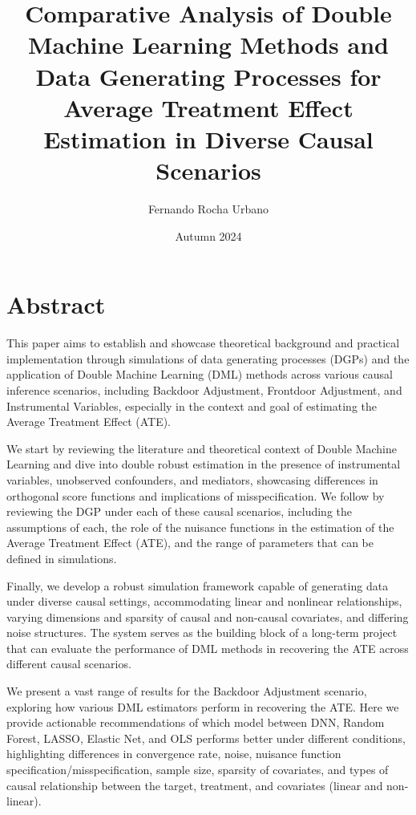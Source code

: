 \documentclass{article}
\title{Comparative Analysis of Double Machine Learning Methods and Data Generating Processes for Average Treatment Effect Estimation in Diverse Causal Scenarios}
\author{Fernando Rocha Urbano}
\date{Autumn 2024}
\numberwithin{equation}{section}
\begin{document}
\maketitle

\section{Abstract}

This paper aims to establish and showcase theoretical background and practical implementation through simulations of data generating processes (DGPs) and the application of Double Machine Learning (DML) methods across various causal inference scenarios, including Backdoor Adjustment, Frontdoor Adjustment, and Instrumental Variables, especially in the context and goal of estimating the Average Treatment Effect (ATE).

We start by reviewing the literature and theoretical context of Double Machine Learning and dive into double robust estimation in the presence of instrumental variables, unobserved confounders, and mediators, showcasing differences in orthogonal score functions and implications of misspecification. We follow by reviewing the DGP under each of these causal scenarios, including the assumptions of each, the role of the nuisance functions in the estimation of the Average Treatment Effect (ATE), and the range of parameters that can be defined in simulations.

Finally, we develop a robust simulation framework capable of generating data under diverse causal settings, accommodating linear and nonlinear relationships, varying dimensions and sparsity of causal and non-causal covariates, and differing noise structures. The system serves as the building block of a long-term project that can evaluate the performance of DML methods in recovering the ATE across different causal scenarios.

We present a vast range of results for the Backdoor Adjustment scenario, exploring how various DML estimators perform in recovering the ATE. Here we provide actionable recommendations of which model between DNN, Random Forest, LASSO, Elastic Net, and OLS performs better under different conditions, highlighting differences in convergence rate, noise, nuisance function specification/misspecification, sample size, sparsity of covariates, and types of causal relationship between the target, treatment, and covariates (linear and non-linear).

\newpage
\tableofcontents
\newpage
\end{document}
